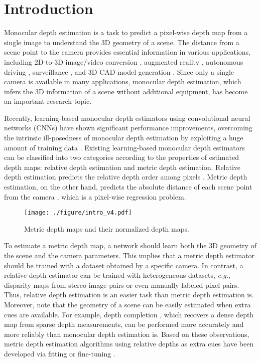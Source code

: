 \documentclass[runningheads]{llncs}
\newcommand{\eg}{\textit{e.g.}}
\begin{document}
\section{Introduction}
\label{sec:introduction}
Monocular depth estimation is a task to predict a pixel-wise depth map from a single image to understand the 3D geometry of a scene. The distance from a scene point to the camera provides essential information in various applications, including 2D-to-3D image/video conversion \cite{Xie2016ECCV}, augmented reality \cite{Liu2018CVPR}, autonomous driving \cite{Godard2017CVPR}, surveillance \cite{kim2016weighted}, and 3D CAD model generation \cite{Izadinia2017CVPR}. Since only a single camera is available in many applications, monocular depth estimation, which infers the 3D information of a scene without additional equipment, has become an important research topic.

Recently, learning-based monocular depth estimators using convolutional neural networks (CNNs) have shown significant performance improvements, overcoming the intrinsic ill-posedness of monocular depth estimation by exploiting a huge amount of training data \cite{eigen2014depth, laina2016deeper, xu2017multi, heo2018monocular, fu2018deep, chen2019structure, yin2019enforcing, lee2020multi, bhat2021adabins}. Existing learning-based monocular depth estimators can be classified into two categories according to the properties of estimated depth maps: relative depth estimation and metric depth estimation. Relative depth estimation predicts the relative depth order among pixels \cite{zoran2015learning, chen2016single, xian2020structure, lienen2021monocular}. Metric depth estimation, on the other hand, predicts the absolute distance of each scene point from the camera \cite{eigen2014depth, laina2016deeper, xu2017multi, heo2018monocular, chen2019structure}, which is a pixel-wise regression problem.

\begin{figure}[!t]
  \centering
   \texttt{[image: ./figure/intro\_v4.pdf]}
   \caption{Metric depth maps and their normalized depth maps.}
   \label{fig:intro}
\end{figure}

To estimate a metric depth map, a network should learn both the 3D geometry of the scene and the camera parameters. This implies that a metric depth estimator should be trained with a dataset obtained by a specific camera. In contrast, a relative depth estimator can be trained with heterogeneous datasets, \eg, disparity maps from stereo image pairs or even manually labeled pixel pairs. Thus, relative depth estimation is an easier task than metric depth estimation is. Moreover, note that the geometry of a scene can be easily estimated when extra cues are available. For example, depth completion \cite{ma2018sparse, xu2019depth, park2020non}, which recovers a dense depth map from sparse depth measurements, can be performed more accurately and more reliably than monocular depth estimation is. Based on these observations, metric depth estimation algorithms using relative depths as extra cues have been developed via fitting \cite{ranftl2020, lienen2021monocular} or fine-tuning \cite{ranftl2021vision}.
\end{document}
